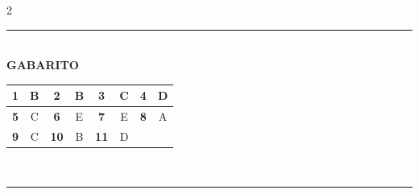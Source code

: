 \documentclass[11pt,a4paper]{article}
\begin{document}
\begin{paracol}{2}
    \switchcolumn[1]
    \vspace{2.5cm}

\end{paracol}

\vspace{0.2cm}

\begin{center}
    \rule{0.6\textwidth}{0.5pt} \\[0.2cm]
    \textbf{\large GABARITO} \\[0.2cm]
    \begin{tabular}{|c|c|c|c|c|c|c|c|}
        \hline
        \textbf{1} & B & \textbf{2}  & B & \textbf{3}  & C & \textbf{4} & D \\ \hline
        \textbf{5} & C & \textbf{6}  & E & \textbf{7}  & E & \textbf{8} & A \\ \hline
        \textbf{9} & C & \textbf{10} & B & \textbf{11} & D & \multicolumn{2}{c|}{} \\ \hline
    \end{tabular} \\[0.2cm]
    \rule{0.6\textwidth}{0.5pt}
\end{center}
\end{document}
